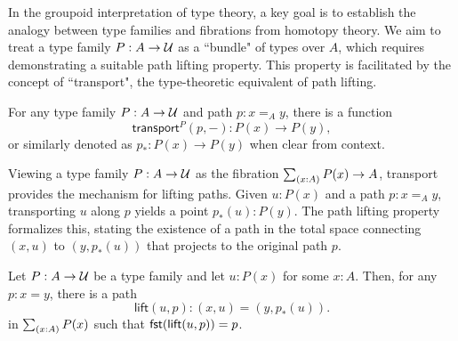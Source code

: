 \documentclass[main.tex]{subfiles}
\begin{document}
In the groupoid interpretation of type theory, a key goal is to establish the analogy between type families and fibrations from homotopy theory. We aim to treat a type family $P : A \to \mathcal{U}$ as a ``bundle" of types over $A$, which requires demonstrating a suitable path lifting property. This property is facilitated by the concept of ``transport", the type-theoretic equivalent of path lifting.
\begin{lemma}
    For any type family $P : A \to \mathcal{U}$ and path $p : x =_A y$, there is a function 
    \[\mathsf{transport}^P(p, -) : P(x) \to P(y),\]
    or similarly denoted as $p_* : P(x) \to P(y)$ when clear from context.
\end{lemma}
Viewing a type family $P : A \to \mathcal{U}$ as the fibration $\sm{x : A}P(x) \to A$, transport provides the mechanism for lifting paths. Given $u : P(x)$ and a path $p : x =_A y$, transporting $u$ along $p$ yields a point $p_*(u) : P(y)$. The path lifting property formalizes this, stating the existence of a path in the total space connecting $(x,u)$ to $(y, p_*(u))$ that projects to the original path $p$.

\begin{lemma}
    Let $P : A \to \mathcal{U}$ be a type family and let $u : P(x)$ for some $x : A$. Then, for any $p : x = y$, there is a path
    $$\mathsf{lift}(u,p) : (x,u) = (y, p_*(u)).$$
    in $\sm{x : A}P(x)$ such that $\mathsf{fst}(\mathsf{lift}(u,p)) = p$.
\end{lemma}
\end{document}
